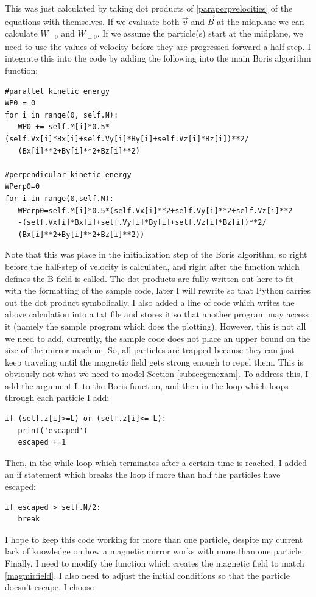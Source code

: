 \documentclass[12pt]{article}
\begin{document}
This was just calculated by taking dot products of \eqref{paraperpvelocities} of the equations with themselves. If we evaluate both $\vec{v}$ and $\vec{B}$ at the midplane we can calculate $W_{\parallel0}$ and $W_{\perp0}$. If we assume the particle(s) start at the midplane, we need to use the values of velocity before they are progressed forward a half step. I integrate this into the code by adding the following into the main Boris algorithm function:
\begin{verbatim}
#parallel kinetic energy            
WP0 = 0
for i in range(0, self.N):
   WP0 += self.M[i]*0.5*(self.Vx[i]*Bx[i]+self.Vy[i]*By[i]+self.Vz[i]*Bz[i])**2/
   (Bx[i]**2+By[i]**2+Bz[i]**2) 
        
#perpendicular kinetic energy
WPerp0=0
for i in range(0,self.N):
   WPerp0=self.M[i]*0.5*(self.Vx[i]**2+self.Vy[i]**2+self.Vz[i]**2
   -(self.Vx[i]*Bx[i]+self.Vy[i]*By[i]+self.Vz[i]*Bz[i])**2/
   (Bx[i]**2+By[i]**2+Bz[i]**2))
\end{verbatim} 
Note that this was place in the initialization step of the Boris algorithm, so right before the half-step of velocity is calculated, and right after the function which defines the B-field is called. The dot products are fully written out here to fit with the formatting of the sample code, later I will rewrite so that Python carries out the dot product symbolically. I also added a line of code which writes the above calculation into a txt file and stores it so that another program may access it (namely the sample program which does the plotting). However, this is not all we need to add, currently, the sample code does not place an upper bound on the size of the mirror machine. So, all particles are trapped because they can just keep traveling until the magnetic field gets strong enough to repel them. This is obviously not what we need to model Section \ref{subsecgenexam}. To address this, I add the argument L to the Boris function, and then in the loop which loops through each particle I add:
\begin{verbatim}
if (self.z[i]>=L) or (self.z[i]<=-L):
   print('escaped')
   escaped +=1
\end{verbatim}
Then, in the while loop which terminates after a certain time is reached, I added an if statement which breaks the loop if more than half the particles have escaped:
\begin{verbatim}
if escaped > self.N/2:
   break
\end{verbatim}
I hope to keep this code working for more than one particle, despite my current lack of knowledge on how a magnetic mirror works with more than one particle. Finally, I need to modify the function which creates the magnetic field to match \eqref{magmirfield}. I also need to adjust the initial conditions so that the particle doesn't escape. I choose
\end{document}
